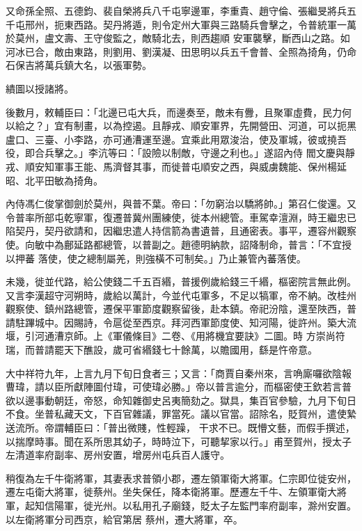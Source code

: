 \begin{pinyinscope}
 又命孫全照、五德鈞、裴自榮將兵八千屯寧邊軍，李重貴、趙守倫、張繼旻將兵五千屯邢州，扼東西路。契丹將遁，則令定州大軍與三路騎兵會擊之，令普統軍一萬於莫州，盧文壽、王守俊監之，敵騎北去，則西趨順
 安軍襲擊，斷西山之路。如河冰已合，敵由東路，則劉用、劉漢凝、田思明以兵五千會普、全照為掎角，仍命石保吉將萬兵鎮大名，以張軍勢。



 繢圖以授諸將。



 後數月，敕輔臣曰：「北邊已屯大兵，而邊奏至，敵未有釁，且聚軍虛費，民力何以給之？」宜有制畫，以為控遏。且靜戎、順安軍界，先開營田、河道，可以扼黑盧口、三臺、小李路，亦可通漕運至邊。宜乘此用眾浚治，使及軍城，彼或撓吾役，即合兵擊之。」李沆等曰：「設險以制敵，守邊之利也。」遂詔內侍
 閻文慶與靜戎、順安知軍事王能、馬濟督其事，而徙普屯順安之西，與威虜魏能、保州楊延昭、北平田敏為掎角。



 內侍馮仁俊掌御劍於莫州，與普不葉。帝曰：「勿窮治以驕將帥。」第召仁俊還。又令普率所部屯乾寧軍，復遷普冀州團練使，徙本州總管。車駕幸澶淵，時王繼忠已陷契丹，契丹欲請和，因繼忠遣人持信箭為書遺普，且通密表。事平，遷容州觀察使。向敏中為鄜延路都總管，以普副之。趙德明納款，詔降制命，普言：「不宜授以押蕃
 落使，使之總制屬羌，則強橫不可制矣。」乃止兼管內蕃落使。



 未幾，徙並代路，給公使錢二千五百緡，普援例歲給錢三千緡，樞密院言無此例。又言李漢超守河朔時，歲給以萬計，今並代屯軍多，不足以犒軍，帝不納。改桂州觀察使、鎮州路總管，遷保平軍節度觀察留後，赴本鎮。帝祀汾陰，還至陜西，普請駐蹕城中。因賜詩，令扈從至西京。拜河西軍節度使、知河陽，徙許州。築大流堰，引河通漕京師。上《軍儀條目》二卷、《用將機宜要訣》二圖。時
 方崇尚符瑞，而普請罷天下醮設，歲可省緡錢七十餘萬，以贍國用，繇是忤帝意。



 大中祥符九年，上言九月下旬日食者三；又言：「商賈自秦州來，言唃廝囉欲陰報曹瑋，請以臣所獻陣圖付瑋，可使瑋必勝。」帝以普言逾分，而樞密使王欽若言普欲以邊事動朝廷，帝怒，命知雜御史呂夷簡劾之。獄具，集百官參驗，九月下旬日不食。坐普私藏天文，下百官雜議，罪當死。議以官當。詔除名，貶賀州，遣使縶送流所。帝謂輔臣曰：「普出微賤，性輕躁，
 干求不已。既懵文藝，而假手撰述，以揣摩時事。聞在系所思其幼子，時時泣下，可聽挈家以行。」甫至賀州，授太子左清道率府副率、房州安置，增房州屯兵百人護守。



 稍復為左千牛衛將軍，其妻表求普領小郡，遷左領軍衛大將軍。仁宗即位徙安州，遷左屯衛大將軍，徙蔡州。坐失保任，降本衛將軍。歷遷左千牛、左領軍衛大將軍，起知信陽軍，徙光州。以私用孔子廟錢，貶太子左監門率府副率，滁州安置。以左衛將軍分司西京，給官第居
 蔡州，遷大將軍，卒。




\end{pinyinscope}
